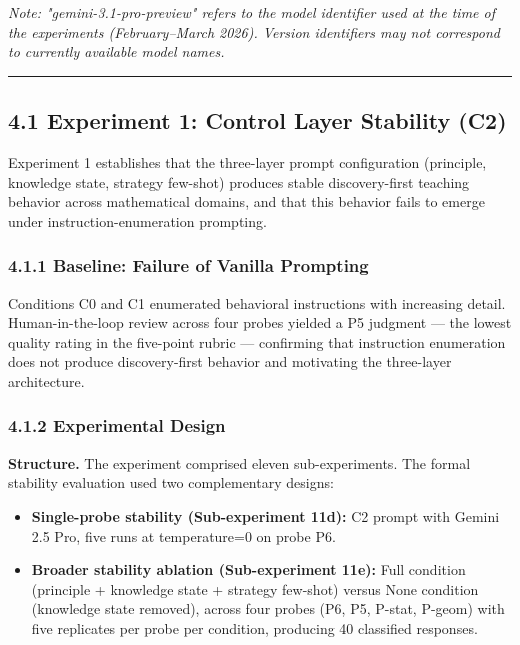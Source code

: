 \documentclass[
]{article}
\providecommand{\tightlist}{%
  \setlength{\itemsep}{0pt}\setlength{\parskip}{0pt}}
\begin{document}
\emph{Note: "gemini-3.1-pro-preview" refers to the model identifier used at the time of the experiments (February--March 2026). Version identifiers may not correspond to currently available model names.}

\begin{center}\rule{0.5\linewidth}{0.5pt}\end{center}

\subsection{4.1 Experiment 1: Control Layer Stability (C2)}\label{41-experiment-1-control-layer-stability-c2}

Experiment 1 establishes that the three-layer prompt configuration (principle, knowledge state, strategy few-shot) produces stable discovery-first teaching behavior across mathematical domains, and that this behavior fails to emerge under instruction-enumeration prompting.

\subsubsection{4.1.1 Baseline: Failure of Vanilla Prompting}\label{411-baseline-failure-of-vanilla-prompting}

Conditions C0 and C1 enumerated behavioral instructions with increasing detail. Human-in-the-loop review across four probes yielded a P5 judgment --- the lowest quality rating in the five-point rubric --- confirming that instruction enumeration does not produce discovery-first behavior and motivating the three-layer architecture.

\subsubsection{4.1.2 Experimental Design}\label{412-experimental-design}

\textbf{Structure.} The experiment comprised eleven sub-experiments. The formal stability evaluation used two complementary designs:

\begin{itemize}
\tightlist
\item
  \textbf{Single-probe stability (Sub-experiment 11d):} C2 prompt with Gemini 2.5 Pro, five runs at temperature=0 on probe P6.
\item
  \textbf{Broader stability ablation (Sub-experiment 11e):} Full condition (principle + knowledge state + strategy few-shot) versus None condition (knowledge state removed), across four probes (P6, P5, P-stat, P-geom) with five replicates per probe per condition, producing 40 classified responses.
\end{itemize}
\end{document}
